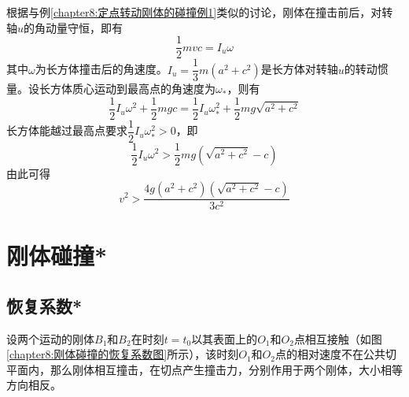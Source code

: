 \begin{solution}
根据与例\ref{chapter8:定点转动刚体的碰撞例1}类似的讨论，刚体在撞击前后，对转轴$u$的角动量守恒，即有
\begin{equation*}
	\frac12 mvc = I_u\omega
\end{equation*}
其中$\omega$为长方体撞击后的角速度。$I_u=\dfrac13m(a^2+c^2)$是长方体对转轴$u$的转动惯量。设长方体质心运动到最高点的角速度为$\omega_*$，则有
\begin{equation*}
	\frac12I_u\omega^2+\frac12mgc=\frac12 I_u\omega_*^2+\frac12mg\sqrt{a^2+c^2}
\end{equation*}
长方体能越过最高点要求$\dfrac12 I_u\omega_*^2>0$，即
\begin{equation*}
	\frac12 I_u\omega^2 > \frac12mg(\sqrt{a^2+c^2}-c)
\end{equation*}
由此可得
\begin{equation*}
	v^2 > \frac{4g(a^2+c^2)(\sqrt{a^2+c^2}-c)}{3c^2}
\end{equation*}
\end{solution}

\section{刚体碰撞*}

\subsection{恢复系数*}

设两个运动的刚体$B_1$和$B_2$在时刻$t=t_0$以其表面上的$O_1$和$O_2$点相互接触（如图\ref{chapter8:刚体碰撞的恢复系数图}所示），该时刻$O_1$和$O_2$点的相对速度不在公共切平面内，那么刚体相互撞击，在切点产生撞击力，分别作用于两个刚体，大小相等方向相反。

